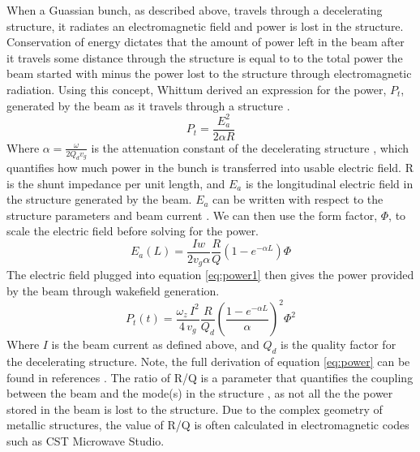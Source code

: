 When a Guassian bunch, as described above, travels through a 
decelerating structure, it radiates an electromagnetic field and 
power is lost in the structure. Conservation of energy dictates 
that the amount of power left in the beam 
after it travels some distance through the structure is equal to 
to the total power the beam started with
minus the power lost to the structure through electromagnetic radiation. 
Using this concept, Whittum derived an expression for the power, $P_t$, 
generated by the beam as it travels through a structure \cite{Whittum}. 
\begin{equation}
P_t = \frac{E^2_a}{2 \alpha R}
\label{eq:power1}
\end{equation} 
Where $\alpha=\frac{\omega}{2Q_{d}v_{g}}$ is the attenuation constant of the 
decelerating structure \cite{CLICdesignReport, Whittum}, which quantifies 
how much power in the bunch is transferred into usable electric field.  R is the shunt impedance
per unit length, and $E_a$ is the longitudinal electric field in the structure
generated by the beam. 
$E_a$ can be written with respect to 
the structure parameters and beam current \cite{PETSeq}. 
We can then use the form factor, $\Phi$, to scale the electric field before 
solving for the power. 
\begin{equation}
E_a\left(L\right) = \frac{Iw}{2 v_g \alpha} \frac{R}{Q} \left(1-e^{-\alpha L}\right) \Phi
\end{equation}
The electric field plugged into equation \ref{eq:power1} then gives the power provided
by the beam through wakefield generation.
\begin{equation}
P_{t}(t)=\frac{\omega_{z}\,I^{2}}{4\,v_{g}}\frac{R}{Q_d}\left(\frac{1-e^{-\alpha L}}{\alpha}\right)^2\Phi^{2}
\label{eq:power}
\end{equation}
Where $I$ is the beam current as defined above, and $Q_{d}$ is the quality factor for the decelerating
structure. Note, the full derivation of equation \ref{eq:power} can be found in references
\cite{PETSeq}. The ratio of R/Q is a parameter that quantifies the coupling between
the beam and the mode(s) in the structure \cite{Whittum}, as not all the the power stored in 
the beam is lost to the structure. Due to the complex geometry of metallic structures,
the value of R/Q is often calculated in electromagnetic codes such
as CST Microwave Studio. 

